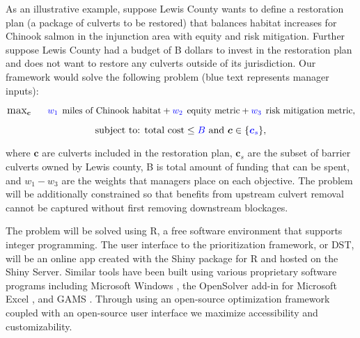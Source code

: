 \documentclass[12pt]{elsarticle}
\begin{document}

As an illustrative example, suppose Lewis County wants to define a restoration plan (a package of culverts to be restored) that balances habitat increases for Chinook salmon in the injunction area with equity and risk mitigation. Further suppose Lewis County had a budget of B dollars to invest in the restoration plan and does not want to restore any culverts outside of its jurisdiction. Our framework would solve the following problem (blue text represents manager inputs):

\begin{equation*}
\substack{\text{\large max}}_{\boldsymbol{c}}\hspace{0.25in} \textcolor{blue}{w_1}\:\: \text{miles of Chinook habitat} + \textcolor{blue}{w_2}\:\: \text{equity metric} + \textcolor{blue}{w_3}\:\: \text{risk mitigation metric},
\end{equation*}

\begin{equation*}
\text{subject to:  total cost} \le \textcolor{blue}{B} \text{ and } \boldsymbol{c} \in \{\textcolor{blue}{\boldsymbol{c}_s}  \},
\end{equation*}

%

where $\boldsymbol{c}$ are culverts included in the restoration plan, $\boldsymbol{c}_s$ are the subset of barrier culverts owned by Lewis county, B is total amount of funding that can be spent, and $w_1-w_3$ are the weights that managers place on each objective. The problem will be additionally constrained so that benefits from upstream culvert removal cannot be captured without first removing downstream blockages.

The problem will be solved using R, a free software environment that supports integer programming. The user interface to the prioritization framework, or DST, will be an online app created with the Shiny package for R and hosted on the Shiny Server. Similar tools have been built using various proprietary software programs including Microsoft Windows \citep{optipass2015migratory}, the OpenSolver add-in for Microsoft Excel \citep{mcmanamay2019commonalities}, and GAMS \citep{moody2017pet}. Through using an open-source optimization framework coupled with an open-source user interface we maximize accessibility and customizability.  
\end{document}
